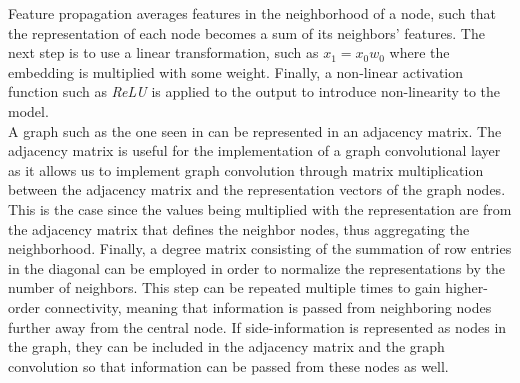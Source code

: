 Feature propagation averages features in the neighborhood of a node, such that the representation of each node becomes a sum of its neighbors' features.
The next step is to use a linear transformation, such as $x_1 = x_0w_0$ where the embedding is multiplied with some weight.
Finally, a non-linear activation function such as \textit{ReLU} is applied to the output to introduce non-linearity to the model.
\\
A graph such as the one seen in  can be represented in an adjacency matrix. 
The adjacency matrix is useful for the implementation of a graph convolutional layer as it allows us to implement graph convolution through matrix multiplication between the adjacency matrix and the representation vectors of the graph nodes.
This is the case since the values being multiplied with the representation are from the adjacency matrix that defines the neighbor nodes, thus aggregating the neighborhood.
Finally, a degree matrix consisting of the summation of row entries in the diagonal can be employed in order to normalize the representations by the number of neighbors.
This step can be repeated multiple times to gain higher-order connectivity, meaning that information is passed from neighboring nodes further away from the central node\cite{SimplifyingGCN, KOrderConnectivity}.
If side-information is represented as nodes in the graph, they can be included in the adjacency matrix and the graph convolution so that information can be passed from these nodes as well.
